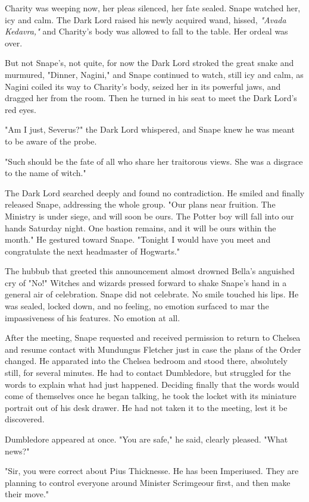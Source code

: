 Charity was weeping now, her pleas silenced, her fate sealed. Snape watched her, icy and calm. The Dark Lord raised his newly acquired wand, hissed, \emph{"Avada Kedavra,"} and Charity's body was allowed to fall to the table. Her ordeal was over.

But not Snape's, not quite, for now the Dark Lord stroked the great snake and murmured, "Dinner, Nagini," and Snape continued to watch, still icy and calm, as Nagini coiled its way to Charity's body, seized her in its powerful jaws, and dragged her from the room. Then he turned in his seat to meet the Dark Lord's red eyes.

"Am I just, Severus?" the Dark Lord whispered, and Snape knew he was meant to be aware of the probe.

"Such should be the fate of all who share her traitorous views. She was a disgrace to the name of witch."

The Dark Lord searched deeply and found no contradiction. He smiled and finally released Snape, addressing the whole group. "Our plans near fruition. The Ministry is under siege, and will soon be ours. The Potter boy will fall into our hands Saturday night. One bastion remains, and it will be ours within the month." He gestured toward Snape. "Tonight I would have you meet and congratulate the next headmaster of Hogwarts."

The hubbub that greeted this announcement almost drowned Bella's anguished cry of "No!" Witches and wizards pressed forward to shake Snape's hand in a general air of celebration. Snape did not celebrate. No smile touched his lips. He was sealed, locked down, and no feeling, no emotion surfaced to mar the impassiveness of his features. No emotion at all.

After the meeting, Snape requested and received permission to return to Chelsea and resume contact with Mundungus Fletcher just in case the plans of the Order changed. He apparated into the Chelsea bedroom and stood there, absolutely still, for several minutes. He had to contact Dumbledore, but struggled for the words to explain what had just happened. Deciding finally that the words would come of themselves once he began talking, he took the locket with its miniature portrait out of his desk drawer. He had not taken it to the meeting, lest it be discovered.

Dumbledore appeared at once. "You are safe," he said, clearly pleased. "What news?"

"Sir, you were correct about Pius Thicknesse. He has been Imperiused. They are planning to control everyone around Minister Scrimgeour first, and then make their move."

